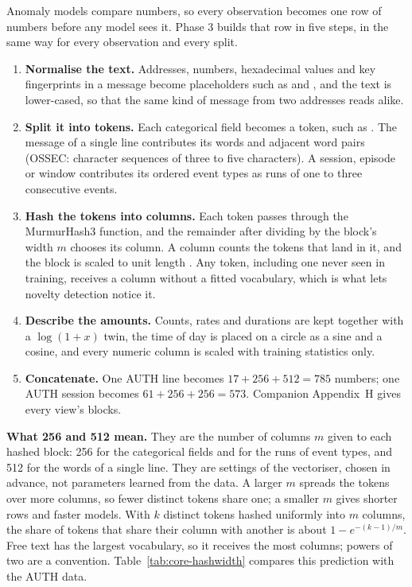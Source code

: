 \documentclass[11pt,a4paper]{article}
\newcommand{\tok}[1]{\texttt{\detokenize{#1}}}
\begin{document}
Anomaly models compare numbers, so every observation becomes one row of numbers before any model sees it. Phase 3 builds that row in five steps, in the same way for every observation and every split.

\begin{enumerate}[leftmargin=*]
\item \textbf{Normalise the text.} Addresses, numbers, hexadecimal values and key fingerprints in a message become placeholders such as \tok{{ip}} and \tok{{number}}, and the text is lower-cased, so that the same kind of message from two addresses reads alike.
\item \textbf{Split it into tokens.} Each categorical field becomes a \tok{column=value} token, such as \tok{event_type=ssh_login_failed}. The message of a single line contributes its words and adjacent word pairs (OSSEC: character sequences of three to five characters). A session, episode or window contributes its ordered event types as runs of one to three consecutive events.
\item \textbf{Hash the tokens into columns.} Each token passes through the MurmurHash3 function, and the remainder after dividing by the block's width \(m\) chooses its column. A column counts the tokens that land in it, and the block is scaled to unit length \cite{ref26}. Any token, including one never seen in training, receives a column without a fitted vocabulary, which is what lets novelty detection notice it.
\item \textbf{Describe the amounts.} Counts, rates and durations are kept together with a \(\log(1+x)\) twin, the time of day is placed on a circle as a sine and a cosine, and every numeric column is scaled with training statistics only.
\item \textbf{Concatenate.} One AUTH line becomes \(17+256+512=785\) numbers; one AUTH session becomes \(61+256+256=573\). Companion Appendix~H gives every view's blocks.
\end{enumerate}

\textbf{What 256 and 512 mean.} They are the number of columns \(m\) given to each hashed block: 256 for the categorical fields and for the runs of event types, and 512 for the words of a single line. They are settings of the vectoriser, chosen in advance, not parameters learned from the data. A larger \(m\) spreads the tokens over more columns, so fewer distinct tokens share one; a smaller \(m\) gives shorter rows and faster models. With \(k\) distinct tokens hashed uniformly into \(m\) columns, the share of tokens that share their column with another is about \(1-e^{-(k-1)/m}\). Free text has the largest vocabulary, so it receives the most columns; powers of two are a convention. Table~\ref{tab:core-hashwidth} compares this prediction with the AUTH data.
\end{document}

